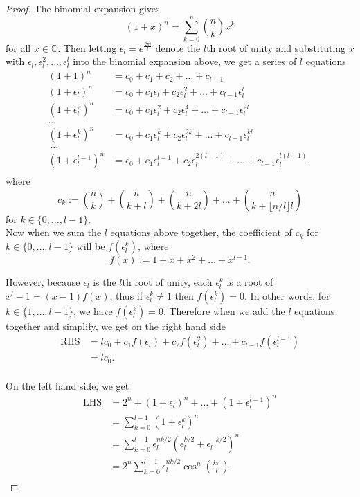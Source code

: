 \documentclass{article}
\begin{document}
\begin{enumerate}[label={\bf Q\arabic*:}]
    \begin{proof}
      The binomial expansion gives
      \[(1+x)^n =\sum_{k=0}^n\binom{n}{k}x^k\]
      for all $x\in\mathbb{C}$. Then letting $\epsilon_l=e^{\frac{2\pi
      i}{l}}$ denote the $l$th root of unity and substituting $x$ with
      $\epsilon_l,\epsilon_l^2,\ldots,\epsilon_l^l$ into the binomial
      expansion above, we get a series of $l$ equations
      \begin{align*}
        (1+1)^n           &=c_0+c_1+c_2+\ldots+c_{l-1}\\
        (1+\epsilon_l)^n   &=c_0+c_1\epsilon_l  +c_2\epsilon_l^2
          +\ldots+c_{l-1}\epsilon_l^l\\
        (1+\epsilon_l^2)^n &=c_0+c_1\epsilon_l^2+c_2\epsilon_l^4
          +\ldots+c_{l-1}\epsilon_l^{2l}\\
        \ldots\\
        (1+\epsilon_l^k)^n &=c_0+c_1\epsilon_l^k+c_2\epsilon_l^{2k}
          +\ldots+c_{l-1}\epsilon_l^{kl}\\\
        \ldots\\
        (1+\epsilon_l^{l-1})^n
          &=c_0+c_1\epsilon_l^{l-1}+c_2\epsilon_l^{2(l-1)}
          +\ldots+c_{l-1}\epsilon_l^{l(l-1)},\\
      \end{align*}
      where
      \[c_k :=\binom{n}{k}+\binom{n}{k+l}+\binom{n}{k+2l}+
      \ldots+\binom{n}{k+\lfloor n/l\rfloor l}\]
      for $k\in\{0,\ldots,l-1\}$. \\

      Now when we sum the $l$ equations above together, the coefficient of
      $c_k$ for $k\in\{0,\ldots,l-1\}$ will be $f(\epsilon_l^k)$, where
      \[f(x):=1+x+x^2+\ldots+x^{l-1}.\]

      However, because $\epsilon_l$ is the $l$th root of unity,
      each $\epsilon_l^k$ is a root of $x^l-1=(x-1)f(x)$, thus if
      $\epsilon_l^k\neq1$ then $f(\epsilon_l^k)=0$. In other words, for
      $k\in\{1,\ldots,l-1\}$, we have $f(\epsilon_l^k)=0$. Therefore when
      we add the $l$ equations together and simplify, we get on the
      right hand side
      \begin{align*}
        \text{RHS} &=lc_0 +c_1f(\epsilon_l) +c_2f(\epsilon_l^2) +\ldots
          +c_{l-1}f(\epsilon_l^{l-1})\\
        &=lc_0.\\
      \end{align*}

      On the left hand side, we get
      \begin{align*}
        \text{LHS} &=2^n+(1+\epsilon_l)^n+\ldots+(1+\epsilon_l^{l-1})^n\\
        &=\sum_{k=0}^{l-1}(1+\epsilon_l^k)^n\\
        &=\sum_{k=0}^{l-1}
          \epsilon_l^{nk/2}(\epsilon_l^{k/2}+\epsilon_l^{-k/2})^n\\
        &=2^n\sum_{k=0}^{l-1}
          \epsilon_l^{nk/2}\cos^n\left(\frac{k\pi}{l}\right).\\
      \end{align*}


\end{proof}
\end{enumerate}
\end{document}
